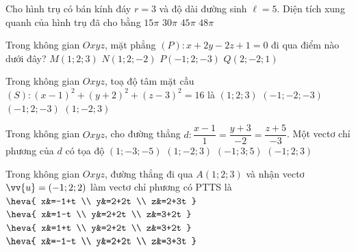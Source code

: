 \begin{ex}%
	Cho hình trụ có bán kính đáy $r=3$ và độ dài đường sinh $\ell=5$. Diện tích xung quanh của hình trụ đã cho bằng
	\choice
	{$15\pi$}
	{\True $30\pi$}
	{$45\pi$}
	{$48\pi$}
\end{ex}	

\begin{ex}%
	Trong không gian $Oxyz$, mặt phẳng $(P)\colon x+2y-2z+1=0$ đi qua điểm nào dưới đây?
	\choice
	{\True $M(1;2;3)$}
	{$N(1;2;-2)$}
	{$P(-1;2;-3)$}
	{$Q(2;-2;1)$}
\end{ex}	

\begin{ex}%
	Trong không gian $Oxyz$, toạ độ tâm mặt cầu $(S)\colon (x-1)^2+(y+2)^2+(z-3)^2=16$ là
	\choice
	{$(1;2;3)$}
	{$(-1;-2;-3)$}
	{$(-1;2;-3)$}
	{\True $(1;-2;3)$}
\end{ex}

\begin{ex}%
	Trong không gian $Oxyz$, cho đường thẳng $d\colon\dfrac{x-1}{1}=\dfrac{y+3}{-2}=\dfrac{z+5}{-3}$. Một vectơ chỉ phương của $d$ có tọa độ
	\choice
	{$(1;-3;-5)$}
	{$(1;-2;3)$}
	{$(-1;3;5)$}
	{\True $(-1;2;3)$}
\end{ex}

\begin{ex}%
	Trong không gian $Oxyz$, đường thẳng đi qua $A(1;2;3)$ và nhận vectơ $\vv{u}=(-1;2;2)$ làm vectơ chỉ phương có PTTS là
	\choice
	{$\heva{
			x&=-1+t
			\\
			y&=2+2t
			\\
			z&=2+3t
		}$}
	{\True $\heva{
			x&=1-t
			\\
			y&=2+2t
			\\
			z&=3+2t
		}$}
	{$\heva{
			x&=1+t
			\\
			y&=2+2t
			\\
			z&=3+2t
		}$}
	{$\heva{
			x&=-1-t
			\\
			y&=2+2t
			\\
			z&=3+3t
		}$}
\end{ex}

